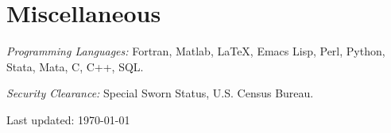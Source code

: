 \documentclass[10pt,letterpaper]{article}
\renewenvironment{itemize}{
  \begin{list}{}{
    \setlength{\leftmargin}{1.5em}
    \setlength{\itemsep}{0.25em}
    \setlength{\parskip}{0pt}
    \setlength{\parsep}{0.25em}
  }
}{
  \end{list}
}
\begin{document}

\section*{Miscellaneous}

\begin{itemize}
\item \textit{Programming Languages:} Fortran, Matlab, \LaTeX, Emacs Lisp, Perl, Python, Stata, Mata, C, C++, SQL.
\item \textit{Security Clearance:} Special Sworn Status, U.S. Census Bureau.
\end{itemize}

\bigskip
{\small Last updated: \today}
\end{document}

